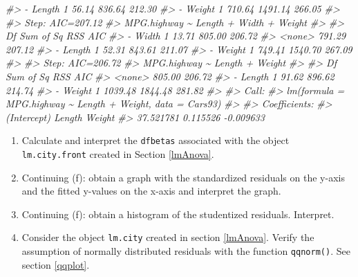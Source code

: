 \documentclass[
]{book}
\newenvironment{Shaded}{\begin{snugshade}}{\end{snugshade}}
\newcommand{\CommentTok}[1]{\textcolor[rgb]{0.56,0.35,0.01}{\textit{#1}}}
\begin{document}
\begin{Shaded}
\begin{Highlighting}[]
\CommentTok{\#\textgreater{} {-} Length        1     56.14  836.64 212.30}
\CommentTok{\#\textgreater{} {-} Weight        1    710.64 1491.14 266.05}
\CommentTok{\#\textgreater{} }
\CommentTok{\#\textgreater{} Step:  AIC=207.12}
\CommentTok{\#\textgreater{} MPG.highway \textasciitilde{} Length + Width + Weight}
\CommentTok{\#\textgreater{} }
\CommentTok{\#\textgreater{}          Df Sum of Sq     RSS    AIC}
\CommentTok{\#\textgreater{} {-} Width   1     13.71  805.00 206.72}
\CommentTok{\#\textgreater{} \textless{}none\textgreater{}                 791.29 207.12}
\CommentTok{\#\textgreater{} {-} Length  1     52.31  843.61 211.07}
\CommentTok{\#\textgreater{} {-} Weight  1    749.41 1540.70 267.09}
\CommentTok{\#\textgreater{} }
\CommentTok{\#\textgreater{} Step:  AIC=206.72}
\CommentTok{\#\textgreater{} MPG.highway \textasciitilde{} Length + Weight}
\CommentTok{\#\textgreater{} }
\CommentTok{\#\textgreater{}          Df Sum of Sq     RSS    AIC}
\CommentTok{\#\textgreater{} \textless{}none\textgreater{}                 805.00 206.72}
\CommentTok{\#\textgreater{} {-} Length  1     91.62  896.62 214.74}
\CommentTok{\#\textgreater{} {-} Weight  1   1039.48 1844.48 281.82}
\CommentTok{\#\textgreater{} }
\CommentTok{\#\textgreater{} Call:}
\CommentTok{\#\textgreater{} lm(formula = MPG.highway \textasciitilde{} Length + Weight, data = Cars93)}
\CommentTok{\#\textgreater{} }
\CommentTok{\#\textgreater{} Coefficients:}
\CommentTok{\#\textgreater{} (Intercept)       Length       Weight  }
\CommentTok{\#\textgreater{}   37.521781     0.115526    {-}0.009633}
\end{Highlighting}
\end{Shaded}

\begin{enumerate}
\def\labelenumi{(\alph{enumi})}
\setcounter{enumi}{6}
\item
  Calculate and interpret the \texttt{dfbetas} associated with the object \texttt{lm.city.front} created in Section \ref{lmAnova}.
\item
  Continuing (f): obtain a graph with the standardized residuals on the y-axis and the fitted y-values on the x-axis and interpret the graph.
\item
  Continuing (f): obtain a histogram of the studentized residuals. Interpret.
\item
  Consider the object \texttt{lm.city} created in section \ref{lmAnova}. Verify the assumption of normally distributed residuals with the function \texttt{qqnorm()}. See section \ref{qqplot}.
\end{enumerate}
\end{document}

